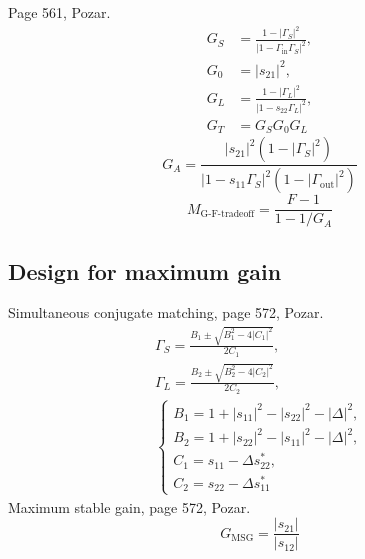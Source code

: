 \documentclass[12pt,a4paper]{article}
\begin{document}
Page 561, Pozar.
\begin{subequations}
  \label{eq:g_t}
  \begin{align}
    G_S &= \frac{1-|\Gamma_S|^2}{|1-\Gamma_\text{in}\Gamma_S|^2}, \\
    G_0 &= |s_{21}|^2, \\
    G_L &= \frac{1-|\Gamma_L|^2}{|1-s_{22}\Gamma_L|^2}, \\
    G_T &= G_SG_0G_L
  \end{align}
\end{subequations}
\begin{equation}
  \label{eq:g_a}
  G_A = \frac{|s_{21}|^2(1-|\Gamma_S|^2)}{|1-s_{11}\Gamma_S|^2(1-|\Gamma_\text{out}|^2)}
\end{equation}
\begin{equation}
  \label{eq:tradeoff}
  M_\text{G-F-tradeoff}=\frac{F-1}{1-1/G_A}
\end{equation}
\subsection{Design for maximum gain}
Simultaneous conjugate matching, page 572, Pozar.
\begin{subequations}
  \label{eq:simultaneous_conjugate}
  \begin{align}
    \Gamma_S=\frac{B_1\pm\sqrt{B_1^2-4|C_1|^2}}{2C_1}, \\
    \Gamma_L=\frac{B_2 \pm\sqrt{B_2^2-4|C_2|^2}}{2C_2}, \\
    \begin{cases}
      B_1=1+|s_{11}|^2-|s_{22}|^2-|\Delta|^2, \\
      B_2=1+|s_{22}|^2-|s_{11}|^2-|\Delta|^2, \\
      C_1=s_{11}-\Delta s^*_{22}, \\
      C_2=s_{22}-\Delta s^*_{11}
    \end{cases}
  \end{align}
\end{subequations}
Maximum stable gain, page 572, Pozar.
\begin{equation}
  \label{eq:g_msg}
  G_\text{MSG}=\frac{|s_{21}|}{|s_{12}|}
\end{equation}
\end{document}
